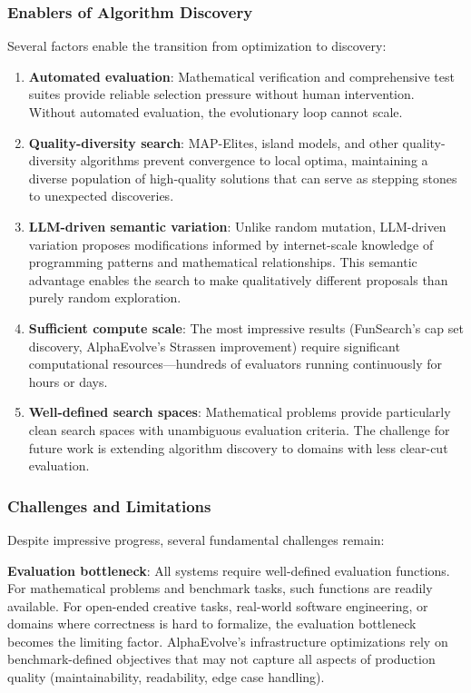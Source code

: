 \subsubsection{Enablers of Algorithm Discovery}

Several factors enable the transition from optimization to discovery:

\begin{enumerate}
\item \textbf{Automated evaluation}: Mathematical verification and comprehensive test suites provide reliable selection pressure without human intervention. Without automated evaluation, the evolutionary loop cannot scale.

\item \textbf{Quality-diversity search}: MAP-Elites, island models, and other quality-diversity algorithms prevent convergence to local optima, maintaining a diverse population of high-quality solutions that can serve as stepping stones to unexpected discoveries.

\item \textbf{LLM-driven semantic variation}: Unlike random mutation, LLM-driven variation proposes modifications informed by internet-scale knowledge of programming patterns and mathematical relationships. This semantic advantage enables the search to make qualitatively different proposals than purely random exploration.

\item \textbf{Sufficient compute scale}: The most impressive results (FunSearch's cap set discovery, AlphaEvolve's Strassen improvement) require significant computational resources---hundreds of evaluators running continuously for hours or days.

\item \textbf{Well-defined search spaces}: Mathematical problems provide particularly clean search spaces with unambiguous evaluation criteria. The challenge for future work is extending algorithm discovery to domains with less clear-cut evaluation.
\end{enumerate}

\subsubsection{Challenges and Limitations}

Despite impressive progress, several fundamental challenges remain:

\textbf{Evaluation bottleneck}: All systems require well-defined evaluation functions. For mathematical problems and benchmark tasks, such functions are readily available. For open-ended creative tasks, real-world software engineering, or domains where correctness is hard to formalize, the evaluation bottleneck becomes the limiting factor. AlphaEvolve's infrastructure optimizations rely on benchmark-defined objectives that may not capture all aspects of production quality (maintainability, readability, edge case handling).

